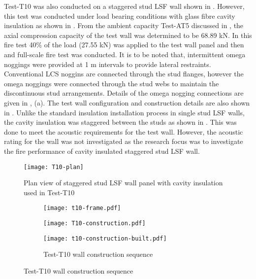 Test-T10 was also conducted on a staggered stud LSF wall shown in . However, this test was conducted under load bearing conditions with glass fibre cavity insulation as shown in . From the ambient capacity Test-AT5 discussed in , the axial compression capacity of the test wall was determined to be 68.89 kN. In this fire test 40\% of the load (27.55 kN) was applied to the test wall panel and then and full-scale fire test was conducted. It is to be noted that, intermittent omega noggings were provided at 1 m intervals to provide lateral restraints. Conventional LCS noggins are connected through the stud flanges, however the omega noggings were connected through the stud webs to maintain the discontinuous stud arrangements. Details of the omega nogging connections are given in ,  (a). The test wall configuration and construction details are also shown in . Unlike the standard insulation installation process in single stud LSF walls, the cavity insulation was staggered between the studs as shown in . This was done to meet the acoustic requirements for the test wall. However, the acoustic rating for the wall was not investigated as the research focus was to investigate the fire performance of cavity insulated staggered stud LSF wall. 
\begin{figure}[!htbp]
	\centering
		\texttt{[image: T10-plan]}
		\caption{Plan view of staggered stud LSF wall panel with cavity insulation used in Test-T10}
		\label{fig:T10-plan}
\end{figure}
\begin{figure}[!htbp]
	\centering
	\begin{subfigure}[b]{0.5\textwidth}
		\centering
		\texttt{[image: t10-frame.pdf]}
		\caption{}
		\label{subfig:t10-frame}
	\end{subfigure}
	\begin{subfigure}[b]{0.5\textwidth}
		\centering
		\texttt{[image: T10-construction.pdf]}
		\caption{}
		\label{subfig:T10-construction}
	\end{subfigure}
	\begin{subfigure}[b]{0.5\textwidth}
		\centering
		\texttt{[image: t10-construction-built.pdf]}
		\caption{Test-T10 wall construction sequence}
		\label{subfig:t10-construction-built}
	\end{subfigure}
	\label{fig:t10-construction-sequence}
\end{figure}

